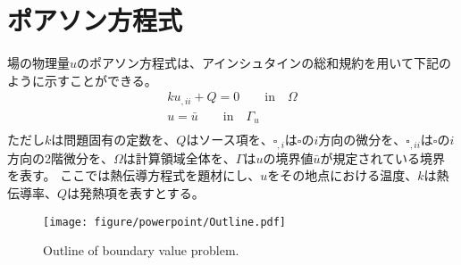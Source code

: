 \documentclass{jarticle}
\begin{document}
\section{ポアソン方程式}
場の物理量$u$のポアソン方程式は、アインシュタインの総和規約を用いて下記のように示すことができる。
\begin{align}
  ku_{,ii} + Q = 0  \qquad \mathrm{in} \quad \Omega \label{eq-1}\\
  u=\bar{u}  \qquad \mathrm{in} \quad \Gamma_u \label{eq-2}\\
\end{align}
ただし$k$は問題固有の定数を、$Q$はソース項を、$\square_{,i}$は$\square$の$i$方向の微分を、$\square_{,ii}$は$\square$の$i$方向の2階微分を、$\Omega$は計算領域全体を、$\Gamma$は$u$の境界値$\bar{u}$が規定されている境界を表す。
ここでは熱伝導方程式を題材にし、$u$をその地点における温度、$k$は熱伝導率、$Q$は発熱項を表すとする。

\begin{figure}[!th]
  \centering
  \texttt{[image: figure/powerpoint/Outline.pdf]}
  \caption{Outline of boundary value problem. }
  
\end{figure}
\end{document}

